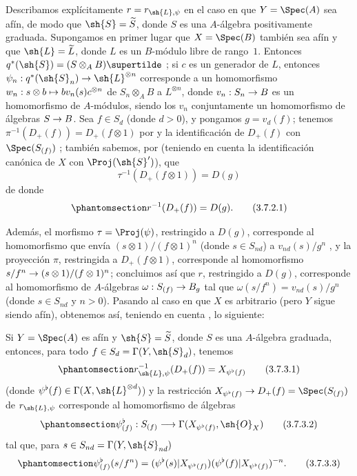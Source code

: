 \documentclass[oneside,10pt]{amsart}
\makeatletter
\newcommand{\ega@arrow}[2]{\mathchoice{#1}{#2}{#2}{#2}}
\let\ega@shortmapsto\mapsto
\renewcommand{\to}{\ega@arrow{\longrightarrow}{\rightarrow}}
\renewcommand{\mapsto}{\ega@arrow{\longmapsto}{\ega@shortmapsto}}
\let\EGAOriginalLabel\label
\renewcommand{\label}[1]{\phantomsection\EGAOriginalLabel{#1}}
\makeatother
\begin{document}
\begin{env}[3.7.2]
\label{II.3.7.2}
Describamos explícitamente $r=r_{\sh{L},\psi}$ en el caso en que $Y=\Spec(A)$ sea afín, de modo que $\sh{S}=\widetilde{S}$, donde $S$ es una $A$-álgebra positivamente graduada.
Supongamos en primer lugar que $X=\Spec(B)$ también sea afín y que $\sh{L}=\widetilde{L}$, donde $L$ es un $B$-módulo libre de rango~$1$.
Entonces $q^*(\sh{S})=(S\otimes_A B)\supertilde$ ;
si $c$ es un generador de $L$, entonces $\psi_n:q^*(\sh{S}_n)\to\sh{L}^{\otimes n}$ corresponde a un homomorfismo $w_n:s\otimes b\mapsto bv_n(s)c^{\otimes n}$ de $S_n\otimes_A B$ a $L^{\otimes n}$, donde $v_n:S_n\to B$ es un homomorfismo de $A$-módulos, siendo los $v_n$ conjuntamente un homomorfismo de álgebras $S\to B$.
Sea $f\in S_d$ (donde $d>0$), y pongamos $g=v_d(f)$;
tenemos $\pi^{-1}(D_+(f))=D_+(f\otimes1)$ por  y la identificación de $D_+(f)$ con $\Spec(S_{(f)})$ ;
también sabemos, por  (teniendo en cuenta la identificación canónica de $X$ con $\Proj(\sh{S}')$), que
\[
  \tau^{-1}(D_+(f\otimes1)) = D(g)
\]
de donde
\[
\label{II.3.7.2.1}
  r^{-1}(D_+(f)) = D(g).
\tag{3.7.2.1}
\]

Además, el morfismo $\tau=\Proj(\psi)$, restringido a $D(g)$, corresponde al homomorfismo que envía $(s\otimes1)/(f\otimes1)^n$ (donde $s\in S_{nd}$) a $v_{nd}(s)/g^n$ , y la proyección $\pi$, restringida a $D_+(f\otimes1)$, corresponde al homomorfismo $s/f^n\to(s\otimes1)/(f\otimes1)^n$;
concluimos así que $r$, restringido a $D(g)$, corresponde al homomorfismo de $A$-álgebras $\omega:S_{(f)}\to B_g$ tal que $\omega(s/f^n)=v_{nd}(s)/g^n$ (donde $s\in S_{nd}$ y $n>0$).
Pasando al caso en que $X$ es arbitrario (pero $Y$ sigue siendo afín), obtenemos así, teniendo en cuenta , lo siguiente:
\end{env}

\begin{proposition}[3.7.3]
\label{II.3.7.3}
Si $Y=\Spec(A)$ es afín y $\sh{S}=\widetilde{S}$, donde $S$ es una $A$-álgebra graduada, entonces, para todo $f\in S_d=\Gamma(Y,\sh{S}_d)$, tenemos
\[
\label{II.3.7.3.1}
  r_{\sh{L},\psi}^{-1}(D_+(f)) = X_{\psi^\flat(f)}
\tag{3.7.3.1}
\]
(donde $\psi^\flat(f)\in\Gamma(X,\sh{L}^{\otimes d})$) y la restricción $X_{\psi^\flat(f)}\to D_+(f)=\Spec(S_{(f)})$ de $r_{\sh{L},\psi}$ corresponde  al homomorfismo de álgebras
\[
\label{II.3.7.3.2}
  \psi_{(f)}^\flat : S_{(f)} \to \Gamma(X_{\psi^\flat(f)},\sh{O}_X)
\tag{3.7.3.2}
\]
tal que, para $s\in S_{nd}=\Gamma(Y,\sh{S}_{nd})$
\[
\label{II.3.7.3.3}
  \psi_{(f)}^\flat(s/f^n) = (\psi^\flat(s)|X_{\psi^\flat(f)})(\psi^\flat(f)|X_{\psi^\flat(f)})^{-n}.
\tag{3.7.3.3}
\]
\end{proposition}
\end{document}
